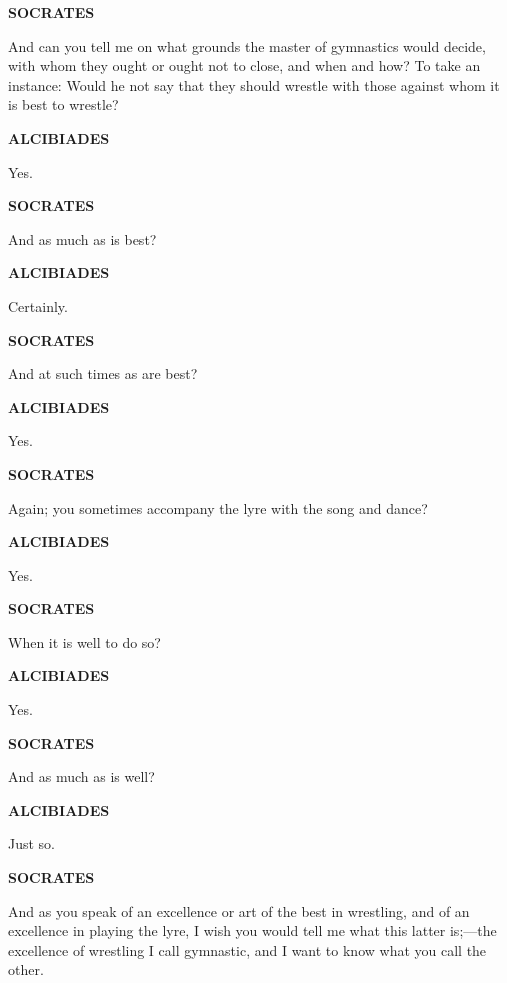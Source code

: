 \documentclass[11pt,letter]{article}
\begin{document}
\par \textbf{SOCRATES}
\par   And can you tell me on what grounds the master of gymnastics would decide, with whom they ought or ought not to close, and when and how? To take an instance:  Would he not say that they should wrestle with those against whom it is best to wrestle?

\par \textbf{ALCIBIADES}
\par   Yes.

\par \textbf{SOCRATES}
\par   And as much as is best?

\par \textbf{ALCIBIADES}
\par   Certainly.

\par \textbf{SOCRATES}
\par   And at such times as are best?

\par \textbf{ALCIBIADES}
\par   Yes.

\par \textbf{SOCRATES}
\par   Again; you sometimes accompany the lyre with the song and dance?

\par \textbf{ALCIBIADES}
\par   Yes.

\par \textbf{SOCRATES}
\par   When it is well to do so?

\par \textbf{ALCIBIADES}
\par   Yes.

\par \textbf{SOCRATES}
\par   And as much as is well?

\par \textbf{ALCIBIADES}
\par   Just so.

\par \textbf{SOCRATES}
\par   And as you speak of an excellence or art of the best in wrestling, and of an excellence in playing the lyre, I wish you would tell me what this latter is;—the excellence of wrestling I call gymnastic, and I want to know what you call the other.
\end{document}
